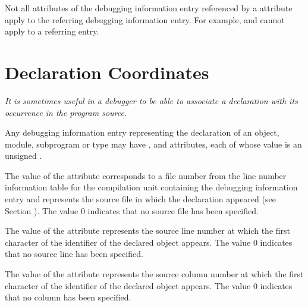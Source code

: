 Not all attributes of the debugging information entry referenced by a
\DWATspecification{} attribute 
apply to the referring debugging information entry.
For
example,
\DWATsibling{} and 
\DWATdeclaration{} 
cannot apply to a 
referring
entry.


\section{Declaration Coordinates}
\label{chap:declarationcoordinates}
\textit{It is sometimes useful in a debugger to be able to associate
a declaration with its occurrence in the program source.}

Any debugging information entry representing 
the declaration of an object, module, subprogram or type may have
\DWATdeclfileDEFN,\hypertarget{chap:DWATdeclfilefilecontainingsourcedeclaration}{}
\DWATdecllineDEFN\hypertarget{chap:DWATdecllinelinenumberofsourcedeclaration}{}
 and 
\DWATdeclcolumnDEFN\hypertarget{chap:DWATdeclcolumncolumnpositionofsourcedeclaration}{}
attributes, each of whose value is an unsigned
.

The value of 
the 
\DWATdeclfile{}
attribute 
corresponds to
a file number from the line number information table for the
compilation unit containing the debugging information entry and
represents the source file in which the declaration appeared
(see Section ). 
The value 0 indicates that no source file
has been specified.

The value of 
the \DWATdeclline{} attribute represents
the source line number at which the first character of
the identifier of the declared object appears. The value 0
indicates that no source line has been specified.

The value of 
the \DWATdeclcolumn{} attribute represents
the source column number at which the first character of
the identifier of the declared object appears. The value 0
indicates that no column has been specified.

